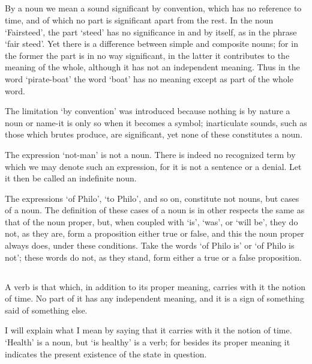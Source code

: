 \documentclass[12pt]{article}
\begin{document}
\subsection{}

  By a noun we mean a sound significant by convention, which has no
reference to time, and of which no part is significant apart from
the rest. In the noun `Fairsteed', the part `steed' has no
significance in and by itself, as in the phrase `fair steed'. Yet
there is a difference between simple and composite nouns; for in the
former the part is in no way significant, in the latter it contributes
to the meaning of the whole, although it has not an independent
meaning. Thus in the word `pirate-boat' the word `boat' has no meaning
except as part of the whole word.

  The limitation `by convention' was introduced because nothing is
by nature a noun or name-it is only so when it becomes a symbol;
inarticulate sounds, such as those which brutes produce, are
significant, yet none of these constitutes a noun.

  The expression `not-man' is not a noun. There is indeed no
recognized term by which we may denote such an expression, for it is
not a sentence or a denial. Let it then be called an indefinite noun.

  The expressions `of Philo', `to Philo', and so on, constitute not
nouns, but cases of a noun. The definition of these cases of a noun is
in other respects the same as that of the noun proper, but, when
coupled with `is', `was', or `will be', they do not, as they are,
form a proposition either true or false, and this the noun proper
always does, under these conditions. Take the words `of Philo is' or
 `of Philo is not'; these words do not, as they stand, form
either a true or a false proposition.

\subsection{}

  A verb is that which, in addition to its proper meaning, carries
with it the notion of time. No part of it has any independent meaning,
and it is a sign of something said of something else.

  I will explain what I mean by saying that it carries with it the
notion of time. `Health' is a noun, but `is healthy' is a verb; for
besides its proper meaning it indicates the present existence of the
state in question.
\end{document}
